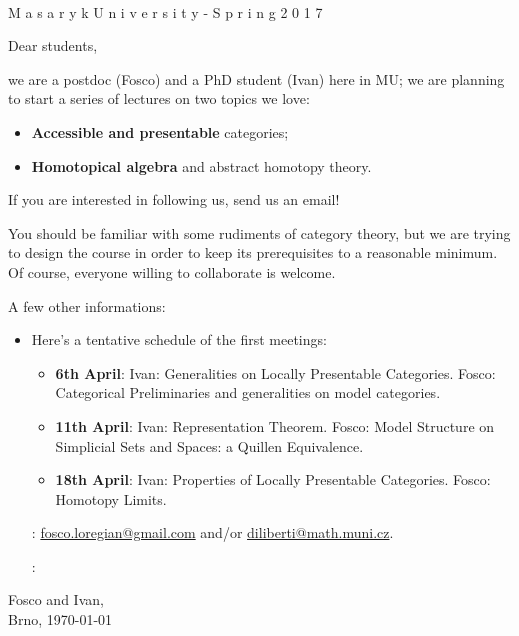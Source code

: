 \documentclass{article}
\begin{document}
\begin{center}
\underline{\huge{}}\\[3em]
\Large \titlefotn M a s a r y k \hspace{5pt} U n i v e r s i t y \hspace{5pt} - \hspace{5pt} S p r i n g \hspace{5pt} 2 0 1 7
\end{center}
Dear students,

we are a postdoc (Fosco) and a PhD student (Ivan) here in MU; we are planning to start a series of lectures on two topics we love:
\begin{itemize}
	\item \textbf{Accessible and presentable} categories; 
	\item \textbf{Homotopical algebra} and abstract homotopy theory.
\end{itemize}

If you are interested in following us, send us an email!

You should be familiar with some rudiments of category theory, but we are trying to design the course in order to keep its prerequisites to a reasonable minimum. Of course, everyone willing to collaborate is welcome.

A few other informations:
\begin{itemize}
\item Here's a tentative schedule of the first meetings:
\begin{itemize}
\item \textbf{6th April}: Ivan: Generalities on Locally Presentable Categories. Fosco: Categorical Preliminaries and generalities on model categories.
\item \textbf{11th April}: Ivan: Representation Theorem. Fosco: Model Structure on Simplicial Sets and Spaces: a Quillen Equivalence.
\item \textbf{18th April}: Ivan: Properties of Locally Presentable Categories. Fosco: Homotopy Limits.
\end{itemize}
	\item[\faEnvelopeO:] \href{mailto:fosco.loregian@gmail.com}{fosco.loregian@gmail.com} and/or \href{mailto:diliberti@math.muni.cz}{diliberti@math.muni.cz}.
	\item[\faGithub:] 
	\item[] 
\end{itemize}
\begin{flushright}
Fosco and Ivan,\\ 
Brno, \today
\end{flushright}
\end{document}
